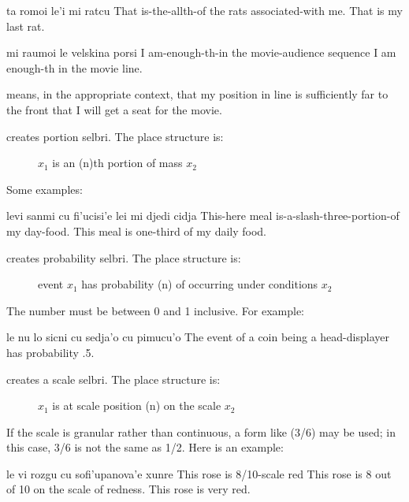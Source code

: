 \begin{example}
ta romoi le'i mi ratcu\n
That is-the-allth-of the rats associated-with me.\n
That is my last rat.
\end{example}

\begin{example}
mi raumoi le velskina porsi\n
I am-enough-th-in the movie-audience sequence\n
I am enough-th in the movie line.
\end{example}

 means, in the appropriate
    context, that my position in line is sufficiently far to the
    front that I will get a seat for the movie. 

 creates portion selbri. The place structure
    is:
\begin{description}
\item[] $x_1$ is an (n)th portion of mass $x_2$

\end{description}

Some examples:
\begin{example}
levi sanmi cu fi'ucisi'e lei mi djedi cidja\n
This-here meal is-a-slash-three-portion-of my day-food.\n
This meal is one-third of my daily food.
\end{example}

 creates probability selbri. The place structure is: 
\begin{description}
\item[] event $x_1$ has probability (n) of occurring under conditions $x_2$
\end{description}

The number must be between 0 and 1 inclusive. For example:
\begin{example}
le nu lo sicni cu sedja'o cu pimucu'o\n
The event of a coin being a head-displayer\n
\T	has probability .5.
\end{example}

 creates a scale selbri. The place structure is: 
\begin{description}
\item[] $x_1$ is at scale position (n) on the scale $x_2$
\end{description}

If the scale is granular rather than continuous, a form like
     (3/6) may be used; in this case, 3/6 is not the
    same as 1/2. Here is an example:
\begin{example}
le vi rozgu cu sofi'upanova'e xunre\n
This rose is 8/10-scale red\n
This rose is 8 out of 10 on the scale of redness.\n
This rose is very red.
\end{example}

